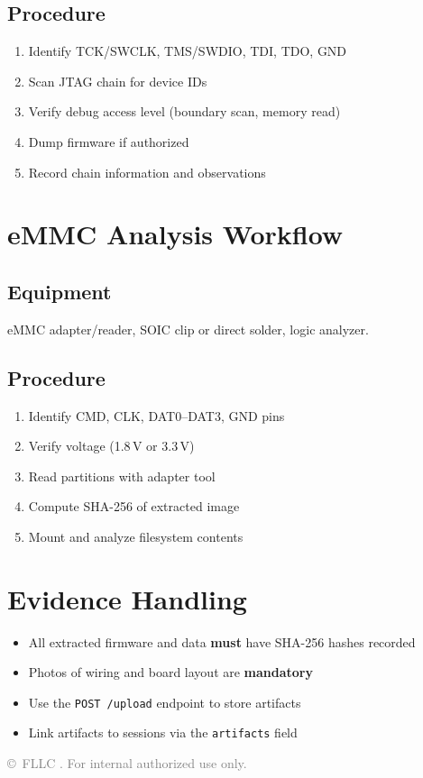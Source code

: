 \documentclass[11pt,a4paper]{article}
\begin{document}
\subsection{Procedure}
\begin{enumerate}
  \item Identify TCK/SWCLK, TMS/SWDIO, TDI, TDO, GND
  \item Scan JTAG chain for device IDs
  \item Verify debug access level (boundary scan, memory read)
  \item Dump firmware if authorized
  \item Record chain information and observations
\end{enumerate}

\section{eMMC Analysis Workflow}
\subsection{Equipment}
eMMC adapter/reader, SOIC clip or direct solder, logic analyzer.
\subsection{Procedure}
\begin{enumerate}
  \item Identify CMD, CLK, DAT0--DAT3, GND pins
  \item Verify voltage (1.8\,V or 3.3\,V)
  \item Read partitions with adapter tool
  \item Compute SHA-256 of extracted image
  \item Mount and analyze filesystem contents
\end{enumerate}

\section{Evidence Handling}
\begin{itemize}
  \item All extracted firmware and data \textbf{must} have SHA-256 hashes recorded
  \item Photos of wiring and board layout are \textbf{mandatory}
  \item Use the \texttt{POST /upload} endpoint to store artifacts
  \item Link artifacts to sessions via the \texttt{artifacts} field
\end{itemize}

\vfill
\begin{center}
\textcolor{gray}{\small\copyright\ FLLC \the\year.  For internal authorized use only.}
\end{center}
\end{document}
